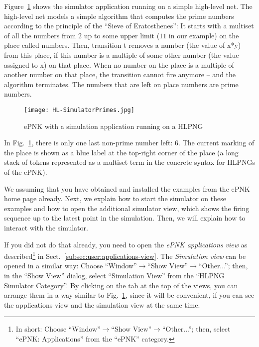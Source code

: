 Figure~\ref{fig:user:hl-simulator-1} shows the simulator application running
on a simple high-level net. The high-level net models a simple algorithm that
computes the prime numbers according to the principle of the ``Sieve of
Eratosthenes'':%
It starts with a multiset of all the numbers from $2$ up to some upper limit
($11$ in our example) on the place called {\sf numbers}. Then, transition {\sf t}
removes a number (the value of {\sf x*y}) from this place, if this number is a
multiple of some other number (the value assigned to {\sf x}) on that place.
When no number on the place is a multiple of another number on that place, 
the transition cannot fire anymore -- and the algorithm terminates. The
numbers that are left on place {\sf numbers} are prime numbers.
%
\begin{figure}[hbt!!]
  \centerline{\texttt{[image: HL-SimulatorPrimes.jpg]}}
  \caption{ePNK with a simulation application running on a HLPNG}
  \label{fig:user:hl-simulator-1}
\end{figure}
%
In Fig.~\ref{fig:user:hl-simulator-1}, there is only one last non-prime
number left: $6$. The current marking of the place is shown as a blue
label at the top-right corner of the place (a long stack of tokens
represented as a multiset term in the concrete syntax for HLPNGs of the
ePNK).

We assuming that you have obtained and installed the examples from the ePNK home
page already. Next, we explain how to start the simulator on these examples
and how to open the additional simulator view, which shows the firing sequence
up to the latest point in the simulation. Then, we will explain how to interact
with the simulator.

If you did not do that already, you need to open the \emph{ePNK applications view}
as described\footnote
  {In short:
   Choose ``Window''$\rightarrow$``Show View''$\rightarrow$``Other...'';
   then, select ``ePNK: Applications'' from the ``ePNK'' category.}
in Sect.~\ref{subsec:user:applications-view}. The \emph{Simulation view}%
can be opened in a similar way: Choose
``Window''$\rightarrow$``Show View''$\rightarrow$``Other...''; then, in
the ``Show View'' dialog, select ``Simulation View'' from the ``HLPNG
Simulator Category''. By clicking on the tab at the top of the views,
you can arrange them in a way similar to Fig.~\ref{fig:user:hl-simulator-1},
since it will be convenient, if you can see the applications view and the
simulation view at the same time.

